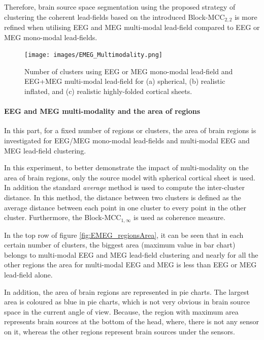 Therefore, brain source space segmentation using the proposed strategy of clustering the coherent lead-fields based on the introduced Block-MCC$_{2,2}$ is more refined when utilising EEG and MEG multi-modal lead-field compared to EEG or MEG mono-modal lead-fields.
\begin{figure}[!b]
\centering
\texttt{[image: images/EMEG\_Multimodality.png]} %
\centering
\caption{Number of clusters using EEG or MEG mono-modal lead-field and EEG+MEG multi-modal lead-field for (a) spherical, (b) realistic inflated, and (c) realistic highly-folded cortical sheets.}
\label{fig:EMEG_Multimodality}
\end{figure}
\FloatBarrier
\paragraph{EEG and MEG multi-modality and the area of regions}
In this part, for a fixed number of regions or clusters, the area of brain regions is investigated for EEG/MEG mono-modal lead-fields and multi-modal EEG and MEG lead-field clustering.

In this experiment, to better demonstrate the impact of multi-modality on the area of brain regions, only the source model with spherical cortical sheet is used.
In addition the standard \emph{average} method is used to compute the inter-cluster distance.
In this method, the distance between two clusters is defined as the average distance between each point in one cluster to every point in the other cluster.
Furthermore, the Block-MCC$_{1,\infty}$ is used as coherence measure.

In the top row of figure \ref{fig:EMEG_regionsArea}, it can be seen that in each certain number of clusters, the biggest area (maximum value in bar chart) belongs to multi-modal EEG and MEG lead-field clustering and nearly for all the other regions the area for multi-modal EEG and MEG is less than EEG or MEG lead-field alone. 

In addition, the area of brain regions are represented in pie charts.
The largest area is coloured as blue in pie charts, which is not very obvious in brain source space in the current angle of view.
Because, the region with maximum area represents brain sources at the bottom of the head, where, there is not any sensor on it, whereas the other regions represent brain sources under the sensors.

